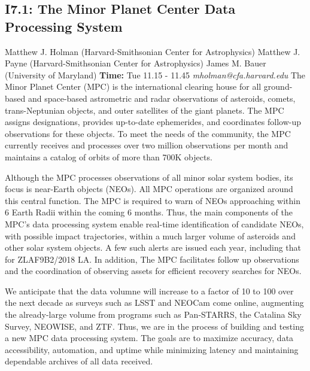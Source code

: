 \documentclass{report}
\begin{document}
\subsection*{I7.1: The Minor Planet Center Data Processing System}
\bigskip
Matthew J. Holman (Harvard-Smithsonian Center for Astrophysics) \newline Matthew J. Payne (Harvard-Smithsonian Center for Astrophysics) \newline  James M. Bauer (University of Maryland)\newline   \newline  \newline  \newline\newline
{\bf Time:} Tue 11.15 - 11.45\newline
\newline
{\it mholman@cfa.harvard.edu}\newline
\newline\newline
The Minor Planet Center (MPC) is the international clearing house for
all ground-based and space-based astrometric and radar observations of
asteroids, comets, trans-Neptunian objects, and outer satellites of the
giant planets. The MPC assigns designations, provides up-to-date
ephemerides, and coordinates follow-up observations for these objects.  
To meet the needs of the community, the MPC currently receives and
processes over two million observations per month and maintains a
catalog of orbits of more than 700K objects.

Although the MPC processes observations of all minor solar system
bodies, its focus is near-Earth objects (NEOs).  All MPC operations
are organized around this central function.  The MPC is required to
warn of NEOs approaching within 6 Earth Radii within the coming 6
months.  Thus, the main components of the MPC's data processing system
enable real-time identification of candidate NEOs, with possible
impact trajectories, within a much larger volume of asteroids and
other solar system objects.  A few such alerts are issued each year,
including that for ZLAF9B2/2018 LA.  In addition, The MPC facilitates
follow up observations and the coordination of observing assets for
efficient recovery searches for NEOs.

We anticipate that the data volumne will increase to a factor of 10 to
100 over the next decade as surveys such as LSST and NEOCam come
online, augmenting the already-large volume from programs such as
Pan-STARRS, the Catalina Sky Survey, NEOWISE, and ZTF.  Thus, we are
in the process of building and testing a new MPC data processing
system.  The goals are to maximize accuracy, data accessibility,
automation, and uptime while minimizing latency and maintaining
dependable archives of all data received.
\end{document}
